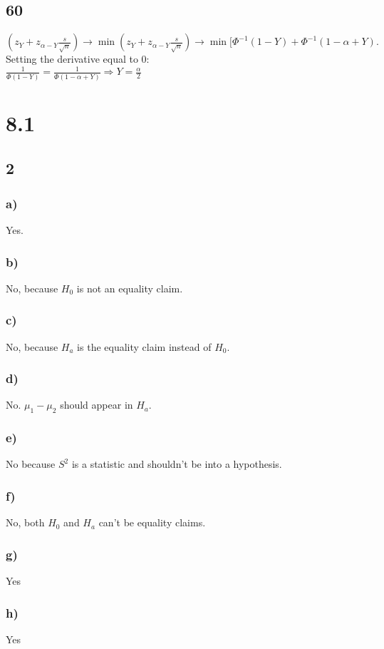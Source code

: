 \documentclass{article}
\begin{document}
	\subsection*{60}			 
		$(z_Y+z_{\alpha - Y} \frac{s}{\sqrt{n}}) \rightarrow \min(z_Y+z_{\alpha - Y} \frac{s}{\sqrt{n}}) \rightarrow \min[\Phi^{-1}(1-Y) + \Phi^{-1} (1-\alpha + Y).$
		\\ Setting the derivative equal to 0:
		\\ $ \frac{1}{\Phi(1-Y)} = \frac{1}{\Phi(1-\alpha+Y)} \Rightarrow Y = \frac{\alpha}{2}$
\section*{8.1}
	\subsection*{2}
		\subsubsection*{a)}
			Yes.
		\subsubsection*{b)}
			No, because $H_0$ is not an equality claim.
		\subsubsection*{c)}
			No, because $H_a$ is the equality claim instead of $H_0$.
		\subsubsection*{d)}
			No. $\mu_1 -\mu_2$ should appear in $H_a$.
		\subsubsection*{e)}
			No because $S^2$ is a statistic and shouldn't be into a hypothesis.
		\subsubsection*{f)}
			No, both $H_0$ and $H_a$ can't be equality claims.
		\subsubsection*{g)}
			Yes
		\subsubsection*{h)}
			Yes
\end{document}
